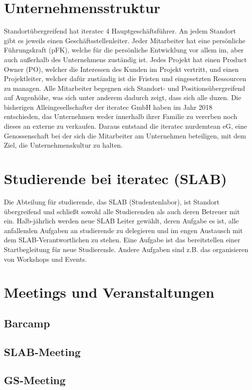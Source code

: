 \section{Unternehmensstruktur}
Standortübergreifend hat iteratec 4 Hauptgeschäftsführer. An jedem Standort gibt es jeweils einen Geschäftsstellenleiter. Jeder Mitarbeiter hat eine persönliche Führungskraft (pFK), welche für die persönliche Entwicklung vor allem im, aber auch außerhalb des Unternehmens zuständig ist. Jedes Projekt hat einen Product Owner (PO), welcher die Interessen des Kunden im Projekt vertritt, und einen Projektleiter, welcher dafür zuständig ist die Fristen und eingesetzten Ressourcen zu managen.
Alle Mitarbeiter begegnen sich Standort- und Positionsübergreifend auf Augenhöhe, was sich unter anderem dadurch zeigt, dass sich alle duzen.
Die bisherigen Alleingesellschafter der iteratec GmbH haben im Jahr 2018 entschieden, das Unternehmen weder innerhalb ihrer Familie zu vererben noch dieses an externe zu verkaufen. Daraus entstand die iteratec nurdemtean eG, eine Genossenschaft bei der sich die Mitarbeiter am Unternehmen beteiligen, mit dem Ziel, die Unternehmenskultur zu halten.

\section{Studierende bei iteratec (SLAB)}
Die Abteilung für studierende, das SLAB (Studentenlabor), ist Standort übergreifend und schließt sowohl alle Studierenden als auch deren Betreuer mit ein. Halb-jährlich werden neue SLAB Leiter gewählt, deren Aufgabe es ist, alle anfallenden Aufgaben an studierende zu delegieren und im engen Austausch mit dem SLAB-Verantwortlichen zu stehen. Eine Aufgabe ist das bereitstellen einer Startbegleitung für neue Studierende. Andere Aufgaben sind z.B. das organisieren von Workshops und Events.

\section{Meetings und Veranstaltungen}
\subsection{Barcamp}
\subsection{SLAB-Meeting}
\subsection{GS-Meeting}
